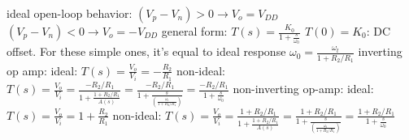 \documentclass[12pt]{article}
\begin{document}
\begin{spacing}{0.8}
\begin{multicols*}{2}
\begin{flushleft}
\begin{outline}[longenum]
  \1 ideal open-loop behavior:
    $(V_p-V_n)>0 \rightarrow V_o=V_{DD}$
    $(V_p-V_n)<0 \rightarrow V_o=-V_{DD}$
  \1 general form: $T(s)=\frac{K_0}{1+\frac{s}{\omega_0}}$
    \2 $T(0)=K_0$: DC offset. For these simple ones, it's equal to ideal response
    \2 $\omega_0=\frac{\omega_t}{1+R_2/R_1}$
  \1 inverting op amp:
    \2 ideal: $T(s)=\frac{V_o}{V_i}=-\frac{R_2}{R_1}$
    \2 non-ideal: $T(s)=\frac{V_o}{V_i}
      =\frac{-R_2/R_1}{1+\frac{1+R_2/R_1}{A(s)}}
      =\frac{-R_2/R_1}{1+\frac{s}{\left(\frac{\omega_t}{1+R_2/R_1}\right)}}
      =\frac{-R_2/R_1}{1+\frac{s}{\omega_0}}$
      \vspace{-5px}
  \1 non-inverting op-amp:
    \2 ideal: $T(s)=\frac{V_o}{V_i}=1+\frac{R_2}{R_1}$
    \2 non-ideal: $T(s)=\frac{V_o}{V_i}
      =\frac{1+R_2/R_1}{1+\frac{1+R_2/R_1}{A(s)}}
      =\frac{1+R_2/R_1}{1+\frac{s}{\left(\frac{\omega_t}{1+R_2/R_1}\right)}}
      =\frac{1+R_2/R_1}{1+\frac{s}{\omega_0}}$


\end{outline}
\end{flushleft}
\end{multicols*}
\end{spacing}
\end{document}
